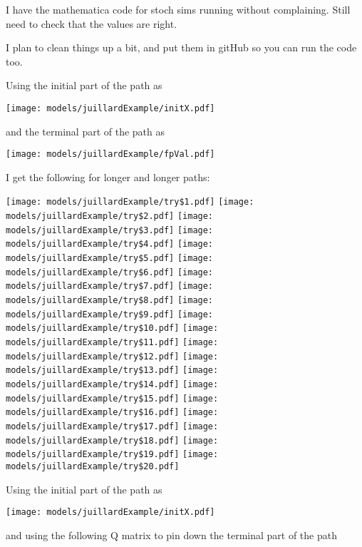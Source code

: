 \documentclass[12pt]{article}
\begin{document}
I have the mathematica code for stoch sims running without complaining.
Still need to check that the values are right.

I plan to
 clean things up a bit, and put them in gitHub so you can run the code too.

  

Using the initial part of the path as

\texttt{[image: models/juillardExample/initX.pdf]}

and the terminal part of the path as


\texttt{[image: models/juillardExample/fpVal.pdf]}

I get the following for longer and longer paths:

\texttt{[image: models/juillardExample/try\$1.pdf]}
\texttt{[image: models/juillardExample/try\$2.pdf]}
\texttt{[image: models/juillardExample/try\$3.pdf]}
\texttt{[image: models/juillardExample/try\$4.pdf]}
\texttt{[image: models/juillardExample/try\$5.pdf]}
\texttt{[image: models/juillardExample/try\$6.pdf]}
\texttt{[image: models/juillardExample/try\$7.pdf]}
\texttt{[image: models/juillardExample/try\$8.pdf]}
\texttt{[image: models/juillardExample/try\$9.pdf]}
\texttt{[image: models/juillardExample/try\$10.pdf]}
\texttt{[image: models/juillardExample/try\$11.pdf]}
\texttt{[image: models/juillardExample/try\$12.pdf]}
\texttt{[image: models/juillardExample/try\$13.pdf]}
\texttt{[image: models/juillardExample/try\$14.pdf]}
\texttt{[image: models/juillardExample/try\$15.pdf]}
\texttt{[image: models/juillardExample/try\$16.pdf]}
\texttt{[image: models/juillardExample/try\$17.pdf]}
\texttt{[image: models/juillardExample/try\$18.pdf]}
\texttt{[image: models/juillardExample/try\$19.pdf]}
\texttt{[image: models/juillardExample/try\$20.pdf]}


Using the initial part of the path as


\texttt{[image: models/juillardExample/initX.pdf]}

and using the following Q matrix to pin down the terminal part of the path 
\end{document}
